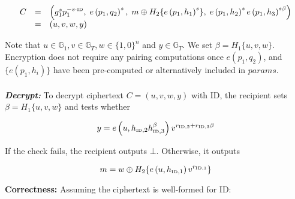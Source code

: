 \documentclass[11pt]{article}
\begin{document}
\begin{equation*}
 \begin{array}{lcl}
  C & = & \left( g_{1}^{s}p_1^{-s\cdot\textrm{\tiny{ID}}}, \; e \left( p_1, q_2\right)^s, \; m \oplus H_2 \{ e \left( p_1, h_1 \right)^s \}, \; e \left( p_1, h_2 \right)^s e \left( p_1, h_3\right)^{s \beta} \right) \\ & = & \left( u, v, w, y \right)
 \end{array}
\end{equation*}

Note that $u \in \mathds{G}_1, v \in \mathds{G}_T,  w \in \{ 1, 0 \}^n$ and $y \in \mathds{G}_T$. We set $\beta = H_1 \{ u, v, w \}$. Encryption does not require any pairing computations once $e \left( p_1, q_2 \right)$, and $\{ e \left( p_1, h_i \right) \}$ have been pre-computed or alternatively included in $params$.\\
\\
\textbf{\textit{Decrypt:}} To decrypt ciphertext $C = \left( u, v, w, y \right)$ with ID, the recipient sets $\beta=H_1 \{ u, v, w \}$ and tests whether

\begin{equation*}
 y = e \left( u, h_{\textrm{\tiny{ID}}, 2}h_{\textrm{\tiny{ID}}, 3}^{\beta} \right)v^{r_{\textrm{\tiny{ID}},2}+r_{\textrm{\tiny{ID}},3}\beta}
\end{equation*}

If the check fails, the recipient outputs $\bot$. Otherwise, it outputs

\begin{equation*}
 m = w \oplus H_2 \{ e \left( u, h_{\textrm{\tiny{ID}}, 1} \right) v^{r_{\textrm{\tiny{ID}}, 1}} \}
\end{equation*}

\textbf{Correctness:} Assuming the ciphertext is well-formed for ID:
\end{document}
